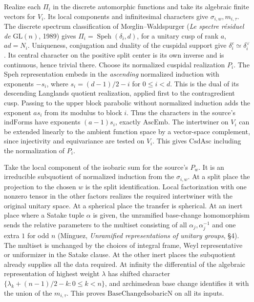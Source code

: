 Realize each $\Pi_i$ in the discrete automorphic functions and
take its algebraic finite vectors for $V_i$. Its local components
and infinitesimal characters give $\sigma_{i,w},m_{i,\tau}$.
The discrete spectrum classification of M\oe glin--Waldspurger
(\emph{Le spectre r\'esiduel de $\mathrm{GL}(n)$}, 1989) gives
$\Pi_i=\operatorname{Speh}(\delta_i,d)$, for a unitary cusp of
rank $a$, $ad=N_i$. Uniqueness, conjugation and duality of the
cuspidal support give $\delta_i^c\simeq\delta_i^\vee$. Its central
character on the positive split center is its own inverse and is
continuous, hence trivial there. Choose its normalized cuspidal
realization $P_i$. The Speh representation embeds in the
\emph{ascending} normalized induction with exponents
$-s_i$, where $s_i=(d-1)/2-i$ for $0\leq i<d$. This is the
dual of its descending Langlands quotient realization, applied
first to the contragredient cusp. Passing to the upper block
parabolic without normalized induction adds the exponent
$a s_i$ from its modulus to block $i$. Thus the characters in
the source's $\mathrm{indForms}$ have exponents $(a-1)s_i$,
exactly $\mathrm{AscEmb}$. The intertwiner on $V_i$ can be
extended linearly to the ambient function space by a vector-space
complement, since injectivity and equivariance are tested on
$V_i$. This gives $\mathrm{CsdAsc}$ including the normalization
of $P_i$.

Take the local component of the isobaric sum for the source's
$P_w$. It is an irreducible subquotient of normalized induction
from the $\sigma_{i,w}$. At a split place the projection to the
chosen $w$ is the split identification. Local factorization with
one nonzero tensor in the other factors realizes the required
intertwiner with the original unitary space. At a spherical place
the transfer is spherical. At an inert place where a Satake tuple
$\alpha$ is given, the unramified base-change homomorphism sends
the relative parameters to the multiset consisting of all
$\alpha_j,\alpha_j^{-1}$ and one extra $1$ for odd $n$
(M\'inguez, \emph{Unramified representations of unitary groups},
\S4). The multiset is unchanged by the choices of integral
frame, Weyl representative or uniformizer in the Satake clause.
At the other inert places the subquotient already supplies all
the data required. At infinity the differential of the
algebraic representation of highest weight $\lambda$ has shifted
character $\{\lambda_k+(n-1)/2-k:0\le k<n\}$, and archimedean
base change identifies it with the union of the $m_{i,\tau}$.
This proves $\mathrm{BaseChangeIsobaricN}$ on all its inputs.

